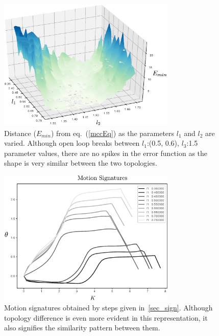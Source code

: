 \documentclass[twocolumn,10pt]{asme2e}
\newcommand{\req}[1]{(\ref{#1})}
\begin{document}
\begin{figure}
\centering
\includegraphics[width=240pt]{figure/fig_sa_distance_function.eps}
  \caption{Distance ($E_{min}$) from eq.~\req{mccEq} as the parameters $l_1$ and $l_2$ are varied. Although open loop breaks between $l_1$:(0.5, 0.6), $l_3$:1.5 parameter values, there are no spikes in the error function as the shape is very similar between the two topologies.}
\label{saErrorFunction}
\end{figure}

\begin{figure}
\centering
\includegraphics[width=240pt]{figure/fig_sa_motion_signatures.eps}
  \caption{Motion signatures obtained by steps given in~\ref{sec_sign}. Although topology difference is even more evident in this representation, it also signifies the similarity pattern between them.}
\label{saMotionSignatures}
\end{figure}
\end{document}
